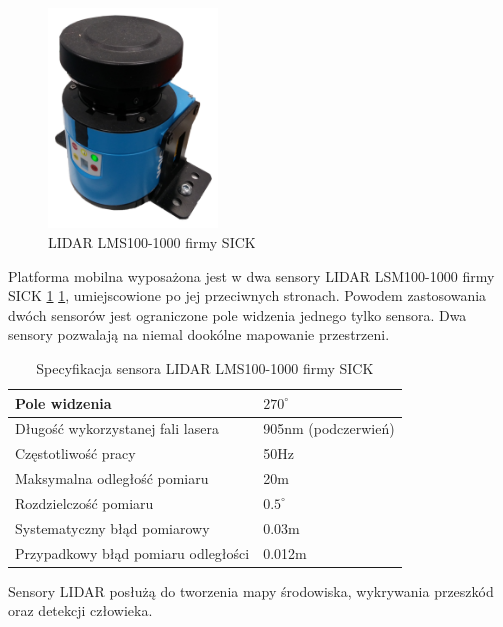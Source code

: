 \begin{figure}[H]
	\centering
	\includegraphics[width=0.4\textwidth]{gfx/lidar.png}
	\caption{LIDAR LMS100-1000 firmy SICK}
	\label{fig:sick}
\end{figure}


Platforma mobilna wyposażona jest w dwa sensory LIDAR LSM100-1000 firmy SICK \ref{fig:sick} \ref{tab:lidar_specification}, umiejscowione po jej przeciwnych stronach. Powodem zastosowania dwóch sensorów jest ograniczone pole widzenia jednego tylko sensora. Dwa sensory pozwalają na niemal dookólne mapowanie przestrzeni.

\begin{table}[h]
\centering
{\renewcommand{\arraystretch}{1.5}
\begin{tabular}{ p{8cm} | p{4cm} }
 Pole widzenia & $270^{\circ}$\\
 \hline
 Długość wykorzystanej fali lasera & 905nm (podczerwień) \\
 \hline
 Częstotliwość pracy & 50Hz \\
 \hline
 Maksymalna odległość pomiaru & 20m \\
 \hline
 Rozdzielczość pomiaru & $0.5^{\circ}$ \\
 \hline
 Systematyczny błąd pomiarowy & 0.03m \\
 \hline
 Przypadkowy błąd pomiaru odległości & 0.012m \\
\end{tabular}}
\caption{Specyfikacja sensora LIDAR LMS100-1000 firmy SICK \cite{omnivelma}}
\label{tab:lidar_specification}
\end{table}


Sensory LIDAR posłużą do tworzenia mapy środowiska, wykrywania przeszkód oraz detekcji człowieka.